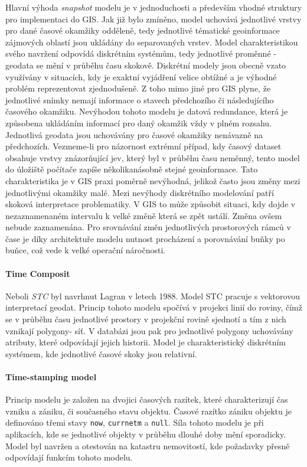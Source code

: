 \documentclass[a4paper,12pt,oneside]{report}
\begin{document}
Hlavní výhoda  \textit{snapshot} modelu je v jednoduchosti a především vhodné struktury pro implementaci do GIS. Jak již bylo zmíněno, model uchovává jednotlivé vrstvy pro dané časové okamžiky odděleně, tedy jednotlivé tématické geoinformace zájmových oblastí jsou ukládány do separovaných vrstev.  Model  charakteristikou svého navržení odpovídá diskrétním systémům, tedy jednotlivé proměnné - geodata se mění v průběhu času skokově. Diskrétní modely jsou obecně vzato využívány v situacích, kdy je exaktní vyjádření velice obtížné a je výhodné problém reprezentovat zjednodušeně. Z toho mimo jiné pro GIS plyne, že jednotlivé snímky nemají informace o stavech  předchozího či následujícího časového okamžiku.
Nevýhodou tohoto modelu je datová redundance, která je způsobena ukládáním informací pro daný okamžik vždy v plném rozsahu.  Jednotlivá geodata jsou uchovávány pro časové okamžiky nenávazně na předchozích. Vezmeme-li pro názornost extrémní případ, kdy časový dataset obsahuje vrstvy znázorňující jev, který byl v průběhu času neměnný, tento model do úložiště počítače zapíše několikanásobně stejné geoinformace. Tato charakteristika je v GIS praxi poměrně nevýhodná, jelikož často jsou změny mezi jednotlivými okamžiky malé.
Mezi nevýhody diskrétního modelování patří skoková interpretace problematiky. V GIS to může způsobit situaci, kdy dojde v nezaznamenaném intervalu k velké změně která se zpět ustálí. Změna ovšem nebude zaznamenána.
Pro srovnávání změn jednotlivých prostorových rámců v čase je díky architektuře modelu nutnost procházení a porovnávání buňky po buňce, což vede k velké operační náročnosti.

\paragraph*{Time Composit}
Neboli \textit{\ac{STC}} byl navrhnut Lagran\cite{lagran} v letech 1988. Model \acs{STC} pracuje s vektorovou interpretací geodat.   Princip tohoto modelu spočívá v projekci linií do roviny, čímž se v průběhu času jednotlivé prostory v projekční rovině sjednotí a tím z nich vznikají polygony- síť. V databázi jsou pak pro jednotlivé polygony uchovávány atributy, které odpovídají jejich historii.
Model je charakteristický diskrétním systémem, kde jednotlivé časové skoky jsou relativní.

\paragraph*{Time-stamping model} 
Princip modelu je založen na dvojici časových razítek, které charakterizují čas vzniku a zániku, či současného stavu objektu. Časové razítko zániku objektu je definováno třemi stavy \texttt{now}, \texttt{currnetm}  a \texttt{null}. 
Síla tohoto modelu je při aplikacích, kde se jednotlivé objekty v průběhu dlouhé doby mění sporadicky. Model byl navržen a otestován na katastru nemovitostí, kde požadavky přesně odpovídají funkcím tohoto modelu.\cite{hunter}
\end{document}
